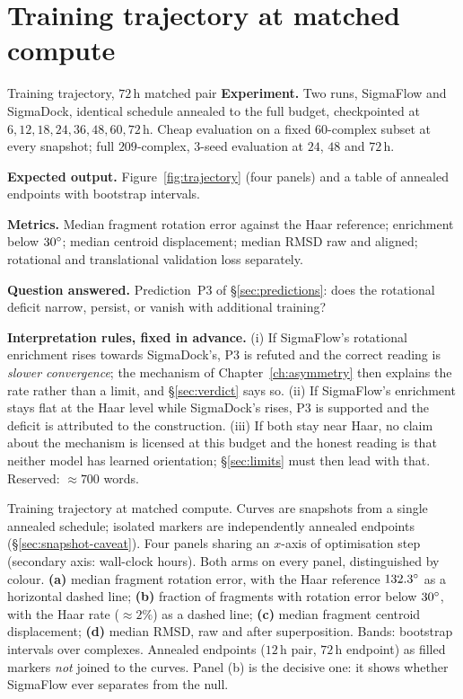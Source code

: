 \section{Training trajectory at matched compute}
\label{sec:traj-results}

\begin{reserved}{Training trajectory, $72$\,h matched pair}
\textbf{Experiment.} Two runs, SigmaFlow and SigmaDock, identical schedule
annealed to the full budget, checkpointed at $6,12,18,24,36,48,60,72$\,h.
Cheap evaluation on a fixed $60$-complex subset at every snapshot; full
$209$-complex, $3$-seed evaluation at $24$, $48$ and $72$\,h.

\textbf{Expected output.} Figure~\ref{fig:trajectory} (four panels) and a
table of annealed endpoints with bootstrap intervals.

\textbf{Metrics.} Median fragment rotation error against the Haar reference;
enrichment below $30^{\circ}$; median centroid displacement; median RMSD raw and
aligned; rotational and translational validation loss separately.

\textbf{Question answered.} Prediction~P3 of \S\ref{sec:predictions}: does the
rotational deficit narrow, persist, or vanish with additional training?

\textbf{Interpretation rules, fixed in advance.}
(i) If SigmaFlow's rotational enrichment rises towards SigmaDock's, P3 is
refuted and the correct reading is \emph{slower convergence}; the mechanism of
Chapter~\ref{ch:asymmetry} then explains the rate rather than a limit, and
\S\ref{sec:verdict} says so.
(ii) If SigmaFlow's enrichment stays flat at the Haar level while SigmaDock's
rises, P3 is supported and the deficit is attributed to the construction.
(iii) If both stay near Haar, no claim about the mechanism is licensed at this
budget and the honest reading is that neither model has learned orientation;
\S\ref{sec:limits} must then lead with that.
Reserved: \(\approx 700\) words.
\end{reserved}

{Training trajectory at matched compute. Curves are snapshots from a single
annealed schedule; isolated markers are independently annealed endpoints
(\S\ref{sec:snapshot-caveat}).}
{Four panels sharing an $x$-axis of optimisation step (secondary axis:
wall-clock hours). Both arms on every panel, distinguished by colour.
\textbf{(a)} median fragment rotation error, with the Haar reference
$132.3^{\circ}$ as a horizontal dashed line;
\textbf{(b)} fraction of fragments with rotation error below $30^{\circ}$, with
the Haar rate ($\approx 2\%$) as a dashed line;
\textbf{(c)} median fragment centroid displacement;
\textbf{(d)} median RMSD, raw and after superposition.
Bands: bootstrap intervals over complexes. Annealed endpoints ($12$\,h pair,
$72$\,h endpoint) as filled markers \emph{not} joined to the curves.
Panel (b) is the decisive one: it shows whether SigmaFlow ever separates from
the null.}

